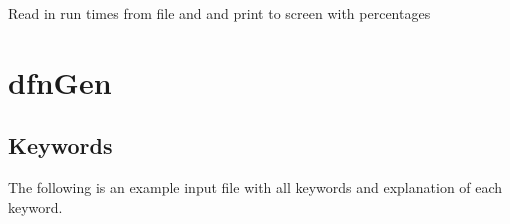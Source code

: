 \documentclass[letterpaper,10pt,english]{sphinxmanual}
\begin{document}

\begin{fulllineitems}
\label{\detokenize{pydfnworks:pydfnworks.helper.print_run_time}}
Read in run times from file and and print to screen with percentages

\end{fulllineitems}



\chapter{dfnGen}
\label{\detokenize{dfngen:dfngen-chapter}}\label{\detokenize{dfngen:dfngen}}\label{\detokenize{dfngen::doc}}

\section{Keywords}
\label{\detokenize{dfngen:keywords}}
The following is an example input file with all keywords and explanation of each keyword.
\end{document}
